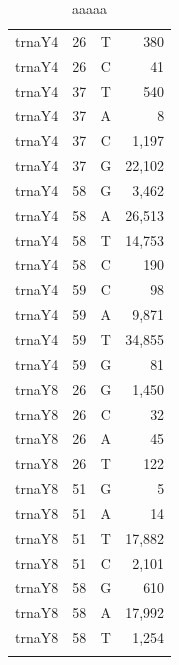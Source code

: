 \documentclass[12pt]{rockefeller}
\begin{document}
\begin{tiny}
\begin{longtable}{|l|r|c|r|}
  trnaY4 &        26 &          T &        380 \\
  trnaY4 &        26 &          C &         41 \\
  trnaY4 &        37 &          T &        540 \\
  trnaY4 &        37 &          A &          8 \\
  trnaY4 &        37 &          C &      1,197 \\
  trnaY4 &        37 &          G &     22,102 \\
  trnaY4 &        58 &          G &      3,462 \\
  trnaY4 &        58 &          A &     26,513 \\
  trnaY4 &        58 &          T &     14,753 \\
  trnaY4 &        58 &          C &        190 \\
  trnaY4 &        59 &          C &         98 \\
  trnaY4 &        59 &          A &      9,871 \\
  trnaY4 &        59 &          T &     34,855 \\
  trnaY4 &        59 &          G &         81 \\
  trnaY8 &        26 &          G &      1,450 \\
  trnaY8 &        26 &          C &         32 \\
  trnaY8 &        26 &          A &         45 \\
  trnaY8 &        26 &          T &        122 \\
  trnaY8 &        51 &          G &          5 \\
  trnaY8 &        51 &          A &         14 \\
  trnaY8 &        51 &          T &     17,882 \\
  trnaY8 &        51 &          C &      2,101 \\
  trnaY8 &        58 &          G &        610 \\
  trnaY8 &        58 &          A &     17,992 \\
  trnaY8 &        58 &          T &      1,254 \\
\hline
\caption[aaa]{aaaaa} 
\label{tableS5}
\end{longtable}
\end{tiny}
\end{document}

